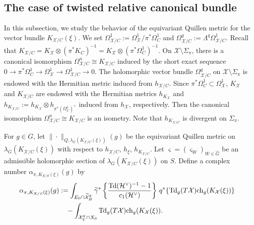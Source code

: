 \documentclass[amscd, leqno]{amsart}
\theoremstyle{plain}
\theoremstyle{definition}
\theoremstyle{remark}
\begin{document}
\subsection
{The case of twisted relative canonical bundle}
\label{sect:3.4}
\par
In this subsection, we study the behavior of the equivariant Quillen metric for the vector bundle $K_{{\mathcal X}/C}(\xi)$.
We set $\Omega_{{\mathcal X}/C}^{1} := \Omega_{\mathcal X}^{1}/\pi^{*}\Omega_{C}^{1}$ and
$\Omega_{{\mathcal X}/C}^{q}:=\Lambda^{q}\Omega_{{\mathcal X}/C}^{1}$. Recall that
$K_{{\mathcal X}/C} = K_{\mathcal X} \otimes (\pi^{*}K_{C})^{-1} = K_{\mathcal X} \otimes (\pi^{*}\Omega^{1}_{C})^{-1}$.
On ${\mathcal X}\setminus\Sigma_{\pi}$, there is a canonical isomorphism $\Omega^{n}_{{\mathcal X}/C} \cong K_{{\mathcal X}/C}$ 
induced by the short exact sequence $0 \to \pi^{*}\Omega_{C}^{1} \to \Omega_{\mathcal X}^{1} \to \Omega_{{\mathcal X}/C}^{1} \to 0$.
The holomorphic vector bundle $\Omega^{q}_{{\mathcal X}/C}$ on ${\mathcal X}\setminus\Sigma_{\pi}$ is endowed with 
the Hermitian metric induced from $h_{{\mathcal X}/C}$.
Since $\pi^{*}\Omega_{C}^{1}\subset\Omega_{\mathcal X}^{1}$, $K_{\mathcal X}$ and $K_{{\mathcal X}/C}$ are 
endowed with the Hermitian metrics $h_{K_{\mathcal X}}$ and 
$h_{K_{{\mathcal X}/C}} := h_{K_{\mathcal X}}\otimes h_{\pi^{*}(\Omega_{C}^{1})^{\lor}}$ induced from $h_{\mathcal X}$, respectively. 
Then the canonical isomorphism $\Omega^{n}_{{\mathcal X}/C} \cong K_{{\mathcal X}/C}$ is an isometry. 
Note that $h_{K_{{\mathcal X}/C}}$ is divergent on $\Sigma_{\pi}$.
\par
For $g\in G$, let $\|\cdot\|_{Q,\lambda_{G}(K_{{\mathcal X}/C}(\xi))}(g)$ be the equivariant Quillen metric on 
$\lambda_{G}(K_{{\mathcal X}/C}(\xi))$ with respect to $h_{{\mathcal X}/C}$, $h_{\xi}$, $h_{K_{{\mathcal X}/C}}$.
Let $\varsigma = (\varsigma_{W})_{W\in\widehat{G}}$ be an admissible holomorphic section of 
$\lambda_{G}(K_{{\mathcal X}/C}(\xi))$ on $S$.
Define a complex number $\alpha_{\pi, K_{X/S}(\xi)}(g)$ by 
\begin{equation}
\label{eqn:log:coeff:tw}
\begin{aligned}
\alpha_{\pi,K_{X/S}(\xi)}(g)
&:=
\int_{E_{0}\cap\widetilde{\mathcal X}^{g}_{H}}
\widetilde{\gamma}^{*}
\left\{
\frac{{\rm Td}({\mathcal H}^{\lor})^{-1}-1}{c_{1}({\mathcal H}^{\lor})}
\right\}\,
q^{*}\{{\rm Td}_{g}(T{\mathcal X}){\rm ch}_{g}(K_{\mathcal X}(\xi))\}
\\
&\quad
-\int_{{\mathcal X}^{g}_{V}\cap X_{0}}{\rm Td}_{g}(T{\mathcal X}){\rm ch}_{g}(K_{\mathcal X}(\xi)).
\end{aligned}
\end{equation}
\end{document}
